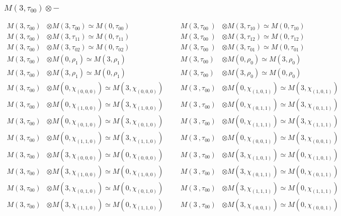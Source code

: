 \subsubsection{$M(3,\tau_{00})\otimes -$}
\begin{align*}
M(3,\tau_{00}) &\otimes M(3,\tau_{00}) \simeq M(0,\tau_{00}) &&& M(3,\tau_{00}\
) &\otimes M(3,\tau_{10}) \simeq M(0,\tau_{10})\\
M(3,\tau_{00}) &\otimes M(3,\tau_{11}) \simeq M(0,\tau_{11}) &&& M(3,\tau_{00}\
) &\otimes M(3,\tau_{12}) \simeq M(0,\tau_{12})\\
M(3,\tau_{00}) &\otimes M(3,\tau_{02}) \simeq M(0,\tau_{02}) &&& M(3,\tau_{00}\
) &\otimes M(3,\tau_{01}) \simeq M(0,\tau_{01})\\
M(3,\tau_{00}) &\otimes M(0,\rho_{1}) \simeq M(3,\rho_{1}) &&& M(3,\tau_{00}) \
&\otimes M(0,\rho_{0}) \simeq M(3,\rho_{0})\\
M(3,\tau_{00}) &\otimes M(3,\rho_{1}) \simeq M(0,\rho_{1}) &&& M(3,\tau_{00}) \
&\otimes M(3,\rho_{0}) \simeq M(0,\rho_{0})\\
M(3,\tau_{00}) &\otimes M(0,\chi_{(0,0,0)}) \simeq M(3,\chi_{(0,0,0)}) &&& M(3\
,\tau_{00}) &\otimes M(0,\chi_{(1,0,1)}) \simeq M(3,\chi_{(1,0,1)})\\
M(3,\tau_{00}) &\otimes M(0,\chi_{(1,0,0)}) \simeq M(3,\chi_{(1,0,0)}) &&& M(3\
,\tau_{00}) &\otimes M(0,\chi_{(0,1,1)}) \simeq M(3,\chi_{(0,1,1)})\\
M(3,\tau_{00}) &\otimes M(0,\chi_{(0,1,0)}) \simeq M(3,\chi_{(0,1,0)}) &&& M(3\
,\tau_{00}) &\otimes M(0,\chi_{(1,1,1)}) \simeq M(3,\chi_{(1,1,1)})\\
M(3,\tau_{00}) &\otimes M(0,\chi_{(1,1,0)}) \simeq M(3,\chi_{(1,1,0)}) &&& M(3\
,\tau_{00}) &\otimes M(0,\chi_{(0,0,1)}) \simeq M(3,\chi_{(0,0,1)})\\
M(3,\tau_{00}) &\otimes M(3,\chi_{(0,0,0)}) \simeq M(0,\chi_{(0,0,0)}) &&& M(3\
,\tau_{00}) &\otimes M(3,\chi_{(1,0,1)}) \simeq M(0,\chi_{(1,0,1)})\\
M(3,\tau_{00}) &\otimes M(3,\chi_{(1,0,0)}) \simeq M(0,\chi_{(1,0,0)}) &&& M(3\
,\tau_{00}) &\otimes M(3,\chi_{(0,1,1)}) \simeq M(0,\chi_{(0,1,1)})\\
M(3,\tau_{00}) &\otimes M(3,\chi_{(0,1,0)}) \simeq M(0,\chi_{(0,1,0)}) &&& M(3\
,\tau_{00}) &\otimes M(3,\chi_{(1,1,1)}) \simeq M(0,\chi_{(1,1,1)})\\
M(3,\tau_{00}) &\otimes M(3,\chi_{(1,1,0)}) \simeq M(0,\chi_{(1,1,0)}) &&& M(3\
,\tau_{00}) &\otimes M(3,\chi_{(0,0,1)}) \simeq M(0,\chi_{(0,0,1)})\\

\end{align*}
